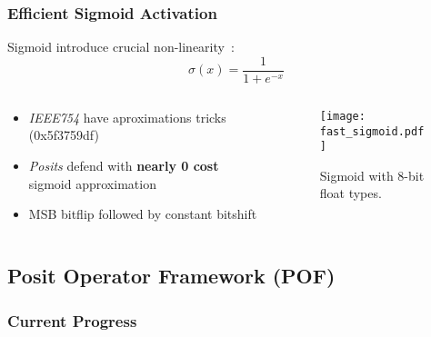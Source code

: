 \begin{frame}
    \frametitle{Efficient Sigmoid Activation}
		 Sigmoid introduce crucial non-linearity~\cite{ding_activation_2018}:
		\begin{equation}
		\sigma(x) = \frac{1}{1+e^{-x}}\nonumber
		\end{equation}

    \begin{columns}
        \begin{column}{0.4\textwidth}
            \begin{itemize}
		\item<1-> \textit{IEEE754} have aproximations tricks (0x5f3759df)
		\item<2-> \textit{Posits} defend with \textbf{nearly 0 cost} sigmoid approximation
                \item<3-> MSB bitflip followed by constant bitshift
            \end{itemize}
        \end{column}
        \begin{column}{0.6\textwidth}
            \begin{figure}[H]
                \centering
                \texttt{[image: fast\_sigmoid.pdf]}
                \caption{Sigmoid with 8-bit float types.}
                \label{fig:fast_sigmoid}
            \end{figure}
        \end{column}

    \end{columns}


\end{frame}

\subsection{Posit Operator Framework (POF)}
\begin{frame}
    \frametitle{Current Progress}

    \tableofcontents[currentsection,
                     subsectionstyle=show/shaded/hide,
                     sectionstyle=show/hide]

\end{frame}

